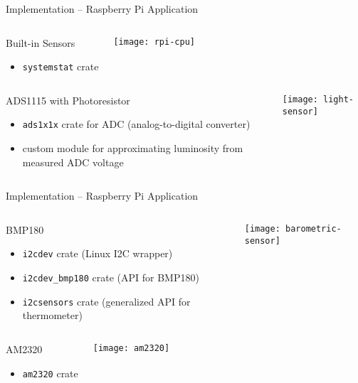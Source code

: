 \begin{frame}{Implementation -- Raspberry Pi Application}
  \begin{columns}
    \begin{block}{Built-in Sensors}
      \begin{itemize}
        \item \texttt{systemstat} crate
      \end{itemize}
    \end{block}

    \vfill
    \centering
    \texttt{[image: rpi-cpu]}
  \end{columns}

  \begin{columns}
    \begin{block}{ADS1115 with Photoresistor}
      \begin{itemize}
        \item \texttt{ads1x1x} crate for ADC (analog-to-digital converter)
        \item custom module for approximating luminosity from measured ADC voltage
      \end{itemize}
    \end{block}

    \vfill
    \centering
    \texttt{[image: light-sensor]}
  \end{columns}
\end{frame}

\begin{frame}{Implementation -- Raspberry Pi Application}
  \begin{columns}
    \begin{block}{BMP180}
      \begin{itemize}
        \item \texttt{i2cdev} crate (Linux I2C wrapper)
        \item \texttt{i2cdev\_bmp180} crate (API for BMP180)
        \item \texttt{i2csensors} crate (generalized API for thermometer)
      \end{itemize}
    \end{block}

    \vfill
    \centering
    \texttt{[image: barometric-sensor]}
  \end{columns}

  \begin{columns}
    \begin{block}{AM2320}
      \begin{itemize}
        \item \texttt{am2320} crate
      \end{itemize}
    \end{block}

    \vfill
    \centering
    \texttt{[image: am2320]}
  \end{columns}
\end{frame}

